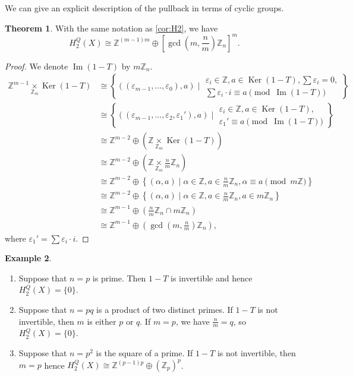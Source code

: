 \documentclass[a4paper,11pt]{amsart}
\theoremstyle{definition}
\newtheorem{thm}{Theorem}
\newtheorem{ex}[thm]{Example}
\newcommand{\Z}{{\mathbb Z}}
\DeclareMathOperator{\im}{Im}
\DeclareMathOperator{\Ker}{Ker}
\newcommand{\znz}[1]{\Z_{#1}}
\begin{document}
We can give an explicit description of the pullback in terms of cyclic groups.
\begin{thm}
With the same notation as \cref{cor:H2}, we have
\[
H_2^Q(X) \cong \Z^{(m-1)m} \oplus \left[\gcd\left(m,\frac{n}{m}\right)\znz{n} \right] ^m.
\]
\end{thm}

\begin{proof}
We denote $\im(1-T)$ by $m\znz{n}$.
\begin{align*}
\Z^{m-1} \underset{\znz{m}}{\times} \Ker(1-T) & \cong
\left\{ ((\varepsilon_{m-1}, \ldots, \varepsilon_0), a) \mid
\begin{array}{lcl}
\varepsilon_i\in \Z, a\in \Ker(1-T), \sum \varepsilon_i=0,\\
\sum \varepsilon_i\cdot i \equiv a \pmod{ \im(1-T) }
\end{array}
\right\} & \\
& \cong 
\left\{ ((\varepsilon_{m-1}, \ldots,\varepsilon_2, \varepsilon_1'), a) \mid
\begin{array}{lcl}
\varepsilon_i\in \Z, a\in \Ker(1-T),\\
\varepsilon_1' \equiv a \pmod{ \im(1-T) }
\end{array}
\right\} \\
&\cong \Z^{m-2} \oplus \left(\Z \underset{\znz{m}}{\times} \Ker(1-T) \right)\\
&\cong \Z^{m-2} \oplus \left(\Z \underset{\znz{m}}{\times} \frac{n}{m}\znz{n} \right)\\
&\cong \Z^{m-2} \oplus \left\{(\alpha, a) \mid \alpha\in \Z, a\in \frac{n}{m}\znz{n}, \alpha\equiv a \pmod {m\Z} \right\} \\
&\cong \Z^{m-2} \oplus \left\{ (\alpha, a) \mid \alpha \in \Z, a\in \frac{n}{m}\znz{n}, a\in m\znz{n} \right\}\\
&\cong \Z^{m-1} \oplus \left( \frac{n}{m}\znz{n}\cap m\znz{n} \right) \\
&\cong \Z^{m-1} \oplus \left(\gcd\left(m,\frac{n}{m}\right)\znz{n} \right),
\end{align*}
where $\varepsilon_1'=\sum \varepsilon_i\cdot i$.
\end{proof}

\begin{ex}
~
\begin{enumerate}
\item Suppose that $n=p$ is prime.
Then $1-T$ is invertible and hence $H_2^Q(X) = \{0 \}$.
\item Suppose that $n=pq$ is a product of two distinct primes.
If $1-T$ is not invertible, then $m$ is either $p$ or $q$.
If $m=p$, we have $\frac{n}{m} = q$, so $H_2^Q(X) = \{0\}$.
\item Suppose that $n=p^2$ is the square of a prime.
If $1-T$ is not invertible, then $m =p$ hence $H_2^Q(X) \cong \Z^{(p-1)p} \oplus \left( \znz{p}\right)^{p}$.
\end{enumerate}
\end{ex}



\end{document}
